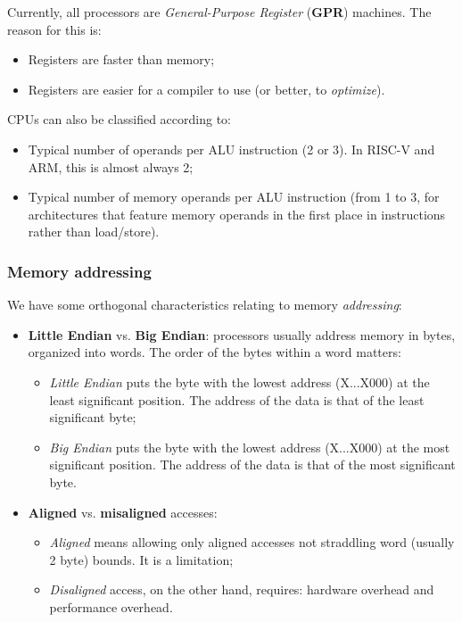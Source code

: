 \documentclass[a4paper,11pt]{article}
\begin{document}
Currently, all processors are \textit{General-Purpose Register} (\textbf{GPR}) machines.
The reason for this is:
\begin{itemize}
\item Registers are faster than memory;
\item Registers are easier for a compiler to use (or better, to \textit{optimize}).
\end{itemize}

CPUs can also be classified according to:
\begin{itemize}
\item Typical number of operands per ALU instruction (2 or 3). In RISC-V and ARM, this is almost always 2;
\item Typical number of memory operands per ALU instruction (from 1 to 3, for architectures that feature memory operands in the first place in instructions rather than load/store).
\end{itemize}

\subsubsection{Memory addressing}

We have some orthogonal characteristics relating to memory \textit{addressing}:
\begin{itemize}
	\item \textbf{Little Endian} vs. \textbf{Big Endian}: processors usually address memory in bytes, organized into words. The order of the bytes within a word matters:
	\begin{itemize}
		\item \textit{Little Endian} puts the byte with the lowest address (X...X000) at the least significant position. The address of the data is that of the least significant byte;
		\item \textit{Big Endian} puts the byte with the lowest address (X...X000) at the most significant position. The address of the data is that of the most significant byte.
	\end{itemize}
\item \textbf{Aligned} vs. \textbf{misaligned} accesses:
	\begin{itemize}
		\item \textit{Aligned} means allowing only aligned accesses not straddling word (usually 2 byte) bounds. It is a limitation;
		\item \textit{Disaligned} access, on the other hand, requires: hardware overhead and performance overhead.
	\end{itemize}
\end{itemize}
\end{document}
